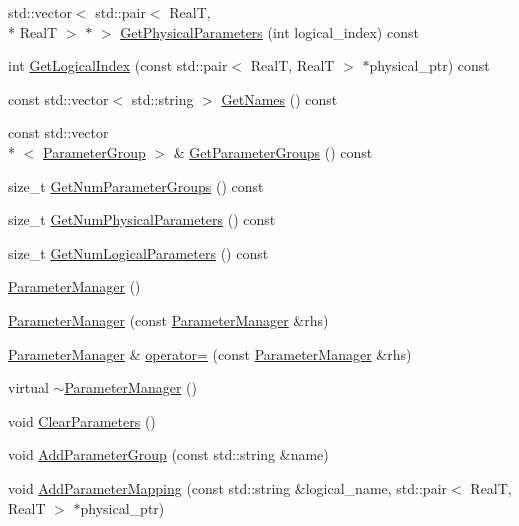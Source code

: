 \begin{DoxyCompactItemize}
\item 
std\+::vector$<$ std\+::pair$<$ Real\+T, \\*
Real\+T $>$ $\ast$ $>$ \hyperlink{class_parameter_manager_ab417ba3f49ef3db98a9c357cde607a79}{Get\+Physical\+Parameters} (int logical\+\_\+index) const 
\item 
int \hyperlink{class_parameter_manager_a46dea3ed20a97d19ff4ddecf1b37d6cd}{Get\+Logical\+Index} (const std\+::pair$<$ Real\+T, Real\+T $>$ $\ast$physical\+\_\+ptr) const 
\item 
const std\+::vector$<$ std\+::string $>$ \hyperlink{class_parameter_manager_a3e53de0b8ec824feef3a6deabf4f419c}{Get\+Names} () const 
\item 
const std\+::vector\\*
$<$ \hyperlink{struct_parameter_group}{Parameter\+Group} $>$ \& \hyperlink{class_parameter_manager_a98e565008f243aa0bab93b801d206339}{Get\+Parameter\+Groups} () const 
\item 
size\+\_\+t \hyperlink{class_parameter_manager_af56ee5380a33948cc6909c874857cb21}{Get\+Num\+Parameter\+Groups} () const 
\item 
size\+\_\+t \hyperlink{class_parameter_manager_a5b12f8857c1c82fa4f8217fb8538d934}{Get\+Num\+Physical\+Parameters} () const 
\item 
size\+\_\+t \hyperlink{class_parameter_manager_ac9b5bef0d35ab50bc34c4eddb6d94c8c}{Get\+Num\+Logical\+Parameters} () const 
\item 
\hyperlink{class_parameter_manager_acf5761f5c6da3ccf6dadcc32ddab086d}{Parameter\+Manager} ()
\item 
\hyperlink{class_parameter_manager_a28319548992949339ec13489b72bc6cc}{Parameter\+Manager} (const \hyperlink{class_parameter_manager}{Parameter\+Manager} \&rhs)
\item 
\hyperlink{class_parameter_manager}{Parameter\+Manager} \& \hyperlink{class_parameter_manager_aa758314ad2219ef3676ae4a78cd166f3}{operator=} (const \hyperlink{class_parameter_manager}{Parameter\+Manager} \&rhs)
\item 
virtual \hyperlink{class_parameter_manager_ab9382e644cf6b073d349a9a5ee60214f}{$\sim$\+Parameter\+Manager} ()
\item 
void \hyperlink{class_parameter_manager_a2548d6948a60b5c0e5f8c8bf4674631f}{Clear\+Parameters} ()
\item 
void \hyperlink{class_parameter_manager_a5dd422fe934ddee56934324e00c54d5c}{Add\+Parameter\+Group} (const std\+::string \&name)
\item 
void \hyperlink{class_parameter_manager_ac10b74d055f4fddf68870a1a21e95fb3}{Add\+Parameter\+Mapping} (const std\+::string \&logical\+\_\+name, std\+::pair$<$ Real\+T, Real\+T $>$ $\ast$physical\+\_\+ptr)

\end{DoxyCompactItemize}
